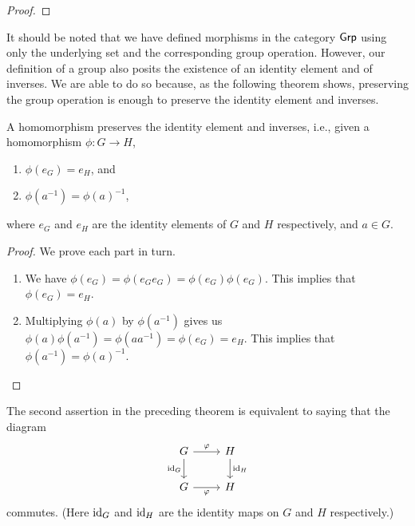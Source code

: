 \begin{proof}
    
\end{proof}

It should be noted that we have defined morphisms in the category \(\mathsf{Grp}\) using
only the underlying set and the corresponding group operation. However, our
definition of a group also posits the existence of an identity element and of
inverses. We are able to do so because, as the following theorem shows,
preserving the group operation is enough to preserve the identity element and
inverses.

\begin{theorem}
    A homomorphism preserves the identity element and inverses, i.e., given a
    homomorphism \(\phi: G \to H\),
    \begin{enumerate}[label=(\alph*)]
        \item \(\phi(e_G) = e_H\), and
        \item \(\phi(a^{-1}) = \phi(a)^{-1}\),
    \end{enumerate}
    where \(e_G\) and \(e_H\) are the identity elements of \(G\) and \(H\)
    respectively, and \(a \in G\).
\end{theorem}

\begin{proof}
    We prove each part in turn.

    \begin{enumerate}[label=(\alph*), wide]
        \item We have \(\phi(e_G) = \phi(e_G e_G) = \phi(e_G) \phi(e_G)\). This
        implies that \(\phi(e_G) = e_H\).
        \item Multiplying \(\phi(a)\) by \(\phi(a^{-1})\) gives us
        \(\phi(a)\phi(a^{-1}) = \phi(aa^{-1}) = \phi(e_G) = e_H\). This implies
        that \(\phi(a^{-1}) = \phi(a)^{-1}\).
    \end{enumerate}
\end{proof}

The second assertion in the preceding theorem is equivalent to saying that the
diagram
\[
    \begin{tikzcd}
        G \arrow{r}{\phi} \arrow[swap]{d}{\id_G} & H \arrow{d}{\id_H} \\
        G \arrow[swap]{r}{\phi} & H
    \end{tikzcd}
\]
commutes. (Here \(\operatorname{id}_G\) and \(\operatorname{id}_H\) are the identity maps on \(G\) and \(H\)
respectively.)

